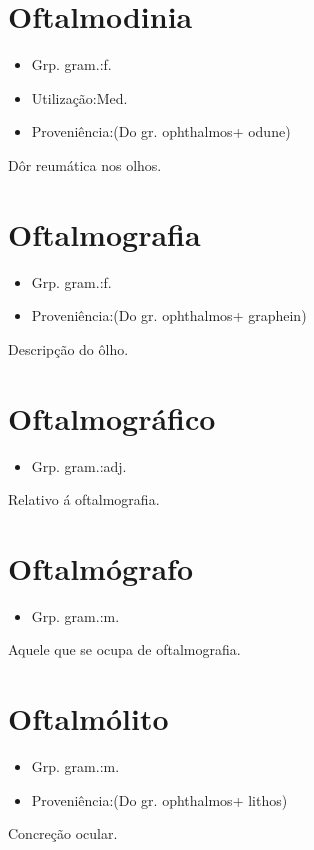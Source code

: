 \section{Oftalmodinia}
\begin{itemize}
\item {Grp. gram.:f.}
\end{itemize}
\begin{itemize}
\item {Utilização:Med.}
\end{itemize}
\begin{itemize}
\item {Proveniência:(Do gr. \textunderscore ophthalmos\textunderscore  + \textunderscore odune\textunderscore )}
\end{itemize}
Dôr reumática nos olhos.
\section{Oftalmografia}
\begin{itemize}
\item {Grp. gram.:f.}
\end{itemize}
\begin{itemize}
\item {Proveniência:(Do gr. \textunderscore ophthalmos\textunderscore  + \textunderscore graphein\textunderscore )}
\end{itemize}
Descripção do ôlho.
\section{Oftalmográfico}
\begin{itemize}
\item {Grp. gram.:adj.}
\end{itemize}
Relativo á oftalmografia.
\section{Oftalmógrafo}
\begin{itemize}
\item {Grp. gram.:m.}
\end{itemize}
Aquele que se ocupa de oftalmografia.
\section{Oftalmólito}
\begin{itemize}
\item {Grp. gram.:m.}
\end{itemize}
\begin{itemize}
\item {Proveniência:(Do gr. \textunderscore ophthalmos\textunderscore  + \textunderscore lithos\textunderscore )}
\end{itemize}
Concreção ocular.
